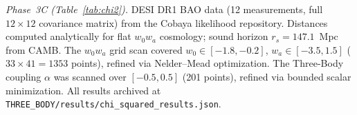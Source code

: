 \documentclass[aps,prd,twocolumn,superscriptaddress,nofootinbib]{revtex4-2}
\theoremstyle{definition}
\theoremstyle{remark}
\begin{document}
\textit{Phase~3C (Table~\ref{tab:chi2}).} DESI DR1 BAO data (12
measurements, full $12 \times 12$ covariance matrix) from the Cobaya
likelihood repository. Distances computed analytically for flat $w_0 w_a$
cosmology; sound horizon $r_s = 147.1$~Mpc from CAMB. The $w_0 w_a$ grid
scan covered $w_0 \in [-1.8, -0.2]$, $w_a \in [-3.5, 1.5]$ ($33 \times
41 = 1353$ points), refined via Nelder--Mead optimization. The Three-Body
coupling $\alpha$ was scanned over $[-0.5, 0.5]$ (201 points), refined via
bounded scalar minimization. All results archived at
\texttt{THREE\_BODY/results/chi\_squared\_results.json}.



\end{document}
